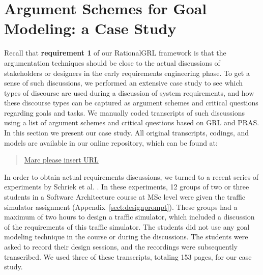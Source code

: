 \section{Argument Schemes for Goal Modeling: a Case Study}
\label{sect:gmas}

Recall that \textbf{requirement 1} of our RationalGRL framework is that the argumentation techniques should be close to the actual discussions of stakeholders or designers in the early requirements engineering phase. To get a sense of such discussions, we performed an extensive case study to see which types of discourse are used during a discussion of system requirements, and how these discourse types can be captured as argument schemes and critical questions regarding goals and tasks. We manually coded transcripts of such discussions using a list of argument schemes and critical questions based on GRL and PRAS. In this section we present our case study. All original transcripts, codings, and models are available in our online repository, which can be found at:  
 
\begin{quote}
\url{Marc please insert URL}
\end{quote}

In order to obtain actual requirements discussions, we turned to a recent series of experiments by Schriek et al. \cite{SchriekEtal2016}. In these experiments, 12 groups of two or three students in a Software Architecture course at MSc level were given the traffic simulator assignment (Appendix~\ref{sect:designprompt}). These groups had a maximum of two hours to design a traffic simulator, which included a discussion of the requirements of this traffic simulator. The students did not use any goal modeling technique in the course or during the discussions. The students were asked to record their design sessions, and the recordings were subsequently transcribed. We used three of these transcripts, totaling 153 pages, for our case study. 


